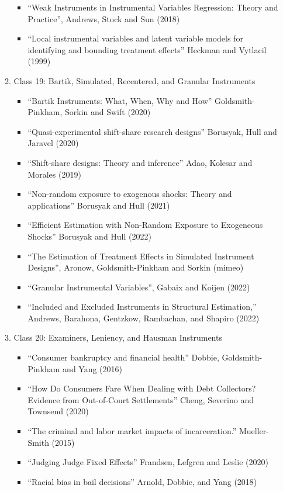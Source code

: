 \documentclass[11pt, a4paper]{article}
\begin{document}
\begin{enumerate}
\begin{enumerate}
\begin{itemize}
    \item ``Weak Instruments in Instrumental Variables Regression: Theory and Practice'', Andrews, Stock and Sun (2018)
    \item ``Local instrumental variables and latent variable models for identifying and bounding treatment effects'' Heckman and  Vytlacil (1999)
    \end{itemize}
  \item Class 19: Bartik, Simulated, Recentered, and Granular Instruments
    \begin{itemize}
    \item ``Bartik Instruments: What, When, Why and How'' Goldsmith-Pinkham, Sorkin and Swift (2020)
    \item ``Quasi-experimental shift-share research designs'' Borusyak, Hull and Jaravel (2020)
    \item ``Shift-share designs: Theory and inference'' Adao, Kolesar and Morales (2019)
    \item ``Non-random exposure to exogenous shocks: Theory and applications'' Borusyak and Hull (2021)
    \item ``Efficient Estimation with Non-Random Exposure to Exogeneous Shocks'' Borusyak and Hull (2022)
    \item ``The Estimation of Treatment Effects in Simulated Instrument Designs'', Aronow, Goldsmith-Pinkham and Sorkin (mimeo)
    \item ``Granular Instrumental Variables'', Gabaix and Koijen (2022)
    \item ``Included and Excluded Instruments in Structural Estimation,'' Andrews, Barahona, Gentzkow, Rambachan, and Shapiro (2022)
    \end{itemize}
  \item Class 20: Examiners, Leniency, and Hausman Instruments
    \begin{itemize}
    \item ``Consumer bankruptcy and financial health'' Dobbie, Goldsmith-Pinkham and Yang (2016)
    \item ``How Do Consumers Fare When Dealing with Debt Collectors? Evidence from Out-of-Court Settlements'' Cheng, Severino and Townsend (2020)
    \item ``The criminal and labor market impacts of incarceration.'' Mueller-Smith (2015)
    \item ``Judging Judge Fixed Effects'' Frandsen, Lefgren and Leslie (2020)
    \item ``Racial bias in bail decisions'' Arnold, Dobbie, and Yang (2018)

\end{itemize}
\end{enumerate}
\end{enumerate}
\end{document}
